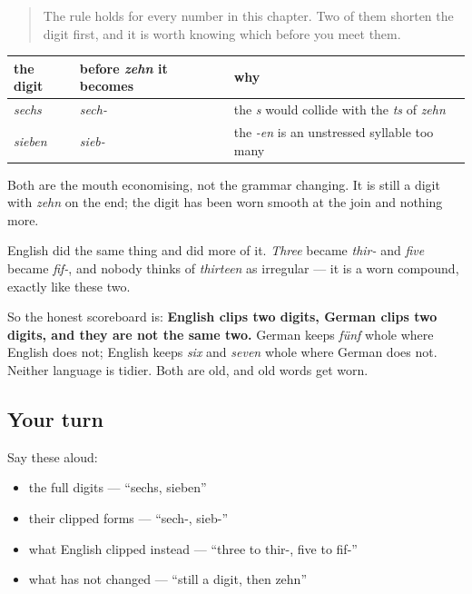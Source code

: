 \label{lesson:GE-C12-klippung}



\begin{quote}
The rule holds for every number in this chapter. Two of them shorten the digit first, and it is worth knowing which before you meet them.
\end{quote}

\begin{grammarlens}[title={Grammar Lens: two digits get shortened}]
\noindent
\begin{tabularx}{\linewidth}{@{}>{\raggedright\arraybackslash}X>{\raggedright\arraybackslash}X>{\raggedright\arraybackslash}X@{}}
\toprule
\textbf{the digit} & \textbf{before \emph{zehn} it becomes} & \textbf{why} \\
\midrule
\emph{sechs} & \emph{sech-} & the \emph{s} would collide with the \emph{ts} of \emph{zehn} \\
\emph{sieben} & \emph{sieb-} & the \emph{-en} is an unstressed syllable too many \\
\bottomrule
\end{tabularx}

Both are the mouth economising, not the grammar changing. It is still a digit with \emph{zehn} on the end; the digit has been worn smooth at the join and nothing more.
\end{grammarlens}

\begin{culture}
English did the same thing and did more of it. \emph{Three} became \emph{thir-} and \emph{five} became \emph{fif-}, and nobody thinks of \emph{thirteen} as irregular — it is a worn compound, exactly like these two.

So the honest scoreboard is: \textbf{English clips two digits, German clips two digits, and they are not the same two.} German keeps \emph{fünf} whole where English does not; English keeps \emph{six} and \emph{seven} whole where German does not. Neither language is tidier. Both are old, and old words get worn.
\end{culture}

\subsection*{Your turn}
Say these aloud:

\begin{itemize}
\raggedright
  \item the full digits — \textquotedblleft{}sechs, sieben\textquotedblright{}
  \item their clipped forms — \textquotedblleft{}sech-, sieb-\textquotedblright{}
  \item what English clipped instead — \textquotedblleft{}three to thir-, five to fif-\textquotedblright{}
  \item what has not changed — \textquotedblleft{}still a digit, then zehn\textquotedblright{}
\end{itemize}

